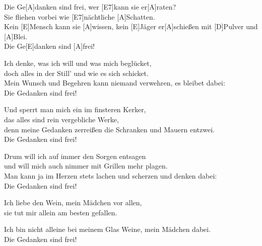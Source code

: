 \def\Titel{Die Gedanken sind frei}
\def\Interpret{Deutsches Volkslied}
\def\Referenz{Möglicher Querverweis auf ein gebräuchliches Liederbuch deiner Wahl}

\EinSchnellesLiedSetup{}   %

\begin{guitarMagic}

    Die Ge[A]danken sind frei, wer [E7]kann sie er[A]raten? \\
    Sie fliehen vorbei wie [E7]nächtliche [A]Schatten.\\
    Kein [E]Mensch kann sie [A]wissen, kein [E]Jäger er[A]schießen
    mit [D]Pulver und [A]Blei.\\
    Die Ge[E]danken sind [A]frei!

    Ich denke, was ich will und was mich beglücket,\\
    doch alles in der Still’
    und wie es sich schicket.\\
    Mein Wunsch und Begehren
    kann niemand verwehren,
    es bleibet dabei:\\
    Die Gedanken sind frei!

    Und sperrt man mich ein
    im finsteren Kerker,\\
    das alles sind rein
    vergebliche Werke,\\
    denn meine Gedanken
    zerreißen die Schranken
    und Mauern entzwei.\\
    Die Gedanken sind frei!

    Drum will ich auf immer
    den Sorgen entsagen\\
    und will mich auch nimmer
    mit Grillen mehr plagen.\\
    Man kann ja im Herzen
    stets lachen und scherzen
    und denken dabei:\\
    Die Gedanken sind frei!

    Ich liebe den Wein,
    mein Mädchen vor allen,\\
    sie tut mir allein
    am besten gefallen.

    Ich bin nicht alleine
    bei meinem Glas Weine,
    mein Mädchen dabei.\\
    Die Gedanken sind frei!
    
\end{guitarMagic}
